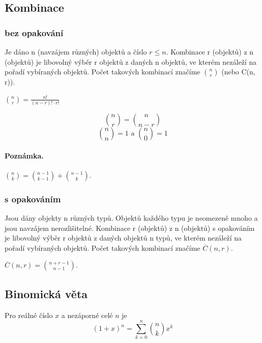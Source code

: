 \subsection{Kombinace}
\subsubsection{bez opakování}
\begin{definition}
	Je dáno n (navzájem různých) objektů a číslo $r \leq n$. Kombinace r (objektů) z n (objektů) je libovolný výběr r objektů z daných n objektů, ve kterém nezáleží na pořadí vybíraných objektů. Počet takových kombinací značíme $n \choose r$ (nebo C(n, r)).
\end{definition}
\begin{sentence}
	${n \choose r} = \frac{n!}{(n - r)! \cdot r!}$
\end{sentence}
$$ {n \choose r} = {n \choose n - r} $$
$${n \choose n} = 1 \text{ a } {n \choose 0} = 1 $$
\paragraph{Poznámka.} ${n \choose k} = {n - 1 \choose k - 1} + {n - 1 \choose k}$.

\subsubsection{s opakováním}
\begin{definition}
	Jsou dány objekty n různých typů. Objektů každého typu je neomezeně mnoho a jsou navzájem nerozlišitelné. Kombinace r (objektů) z n (objektů) s opakováním je libovolný výběr r objektů z daných objektů n typů, ve kterém nezáleží na pořadí vybíraných objektů. Počet takových kombinací značíme $\overline{C}(n, r)$.
\end{definition}
\begin{sentence}
	$\overline{C}(n, r) = {n + r - 1 \choose n - 1}$.
\end{sentence}

\subsection{Binomická věta}
\begin{sentence}
Pro reálné číslo $x$ a nezáporné celé $n$ je $$(1 + x)^n = \sum\limits_{k=0}^n {n \choose k} x^k $$
\end{sentence}

